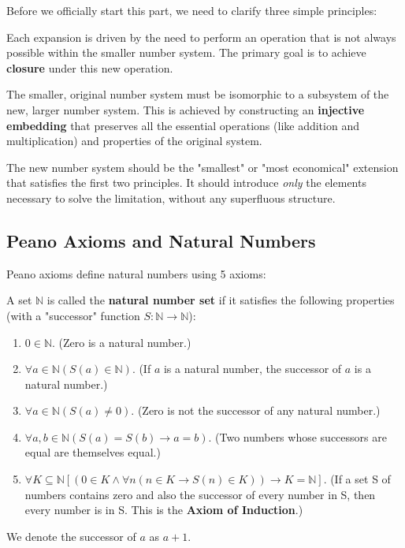 Before we officially start this part, we need to clarify three simple principles:
\begin{description}[style=nextline,leftmargin=2.5em]
    \item[Motivation Principle (Solving a Limitation)] Each expansion is driven by the need to perform an operation that is not always possible within the smaller number system. The primary goal is to achieve \textbf{closure} under this new operation.
    \item[Embedding Principle (Preserving the Original Structure)] The smaller, original number system must be isomorphic to a subsystem of the new, larger number system. This is achieved by constructing an \textbf{injective embedding} that preserves all the essential operations (like addition and multiplication) and properties of the original system.
    \item[Minimality Principle (The "Smallest" Extension)] The new number system should be the "smallest" or "most economical" extension that satisfies the first two principles. It should introduce \emph{only} the elements necessary to solve the limitation, without any superfluous structure.
\end{description}

\subsection{Peano Axioms and Natural Numbers}
Peano axioms define natural numbers using 5 axioms:
\begin{definition}
A set $\mathbb{N}$ is called the \textbf{natural number set} if it satisfies the following properties (with a "successor" function $S: \mathbb{N} \to \mathbb{N}$):
\begin{enumerate}
    \item $0 \in \mathbb{N}$. (Zero is a natural number.)
    \item $\forall a \in \mathbb{N} (S(a) \in \mathbb{N})$. (If $a$ is a natural number, the successor of $a$ is a natural number.)
    \item $\forall a \in \mathbb{N} (S(a) \ne 0)$. (Zero is not the successor of any natural number.)
    \item $\forall a, b \in \mathbb{N} (S(a) = S(b) \to a = b)$. (Two numbers whose successors are equal are themselves equal.)
    \item $\forall K \subseteq \mathbb{N} [(0 \in K \wedge \forall n (n \in K \to S(n) \in K)) \to K = \mathbb{N}]$. (If a set S of numbers contains zero and also the successor of every number in S, then every number is in S. This is the \textbf{Axiom of Induction}.)
\end{enumerate}
We denote the successor of $a$ as $a+1$.
\end{definition}

